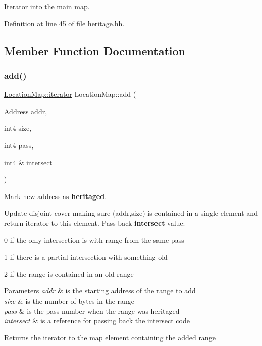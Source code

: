 Iterator into the main map. 



Definition at line 45 of file heritage.\+hh.



\subsection{Member Function Documentation}
\mbox{\label{class_location_map_a72014909f852e240636856c3fec0ca04}} 
\subsubsection{\texorpdfstring{add()}{add()}}
{\footnotesize\ttfamily \mbox{\hyperlink{class_location_map_a13612b4d0583b85205f3ad6476c2aef9}{Location\+Map\+::iterator}} Location\+Map\+::add (\begin{DoxyParamCaption}\item[{\mbox{\hyperlink{class_address}{Address}}}]{addr,  }\item[{int4}]{size,  }\item[{int4}]{pass,  }\item[{int4 \&}]{intersect }\end{DoxyParamCaption})}



Mark new address as {\bfseries{heritaged}}. 

Update disjoint cover making sure (addr,size) is contained in a single element and return iterator to this element. Pass back {\bfseries{intersect}} value\+:
\begin{DoxyItemize}
\item 0 if the only intersection is with range from the same pass
\item 1 if there is a partial intersection with something old
\item 2 if the range is contained in an old range 
\begin{DoxyParams}{Parameters}
{\em addr} & is the starting address of the range to add \\
\hline
{\em size} & is the number of bytes in the range \\
\hline
{\em pass} & is the pass number when the range was heritaged \\
\hline
{\em intersect} & is a reference for passing back the intersect code \\
\hline
\end{DoxyParams}
\begin{DoxyReturn}{Returns}
the iterator to the map element containing the added range 
\end{DoxyReturn}

\end{DoxyItemize}

